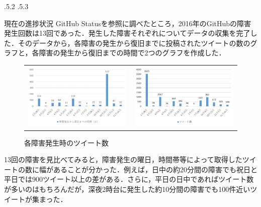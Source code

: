 \documentclass[uplatex]{jsarticle}
\makeatletter
\renewcommand{\section}{%
    \if@slide\clearpage\fi
    \@startsection{section}{1}{\z@}%
    {\Cvs \@plus.5\Cdp \@minus.2\Cdp}%
    {.5\Cvs \@plus.3\Cdp}%
    {\normalfont\raggedright}}
\makeatother
\begin{document}
\section{現在の進捗状況}
GitHub Statusを参照に調べたところ，2016年のGitHubの障害発生回数は13回であった．発生した障害それぞれについてデータの収集を完了した．そのデータから，各障害の発生から復旧までに投稿されたツイートの数のグラフと，各障害の発生から復旧までの時間で2つのグラフを作成した．
\begin{center}
\begin{figure}[htbp]
\begin{tabular}{cc}
\begin{minipage}[t]{0.5\hsize}
 \centering
 \includegraphics[width=8.5cm,clip]{graph1.pdf}
 \caption{各障害の発生から復旧までの時間}
 \label{ラベル1}
\end{minipage} &
\begin{minipage}[t]{0.5\hsize}
 \centering
 \includegraphics[width=8.5cm,clip]{graph2.pdf}
 \caption{各障害発生時のツイート数}
 \label{ラベル2}
\end{minipage}
\end{tabular}
\end{figure}
\end{center}

13回の障害を見比べてみると，障害発生の曜日，時間帯等によって取得したツイートの数に幅があることが分かった．例えば，日中の約20分間の障害でも祝日と平日では900ツイート以上の差がある．さらに，平日の日中であればツイート数が多いのはもちろんだが，深夜2時台に発生した約10分間の障害でも100件近いツイートが集まった．
\end{document}
